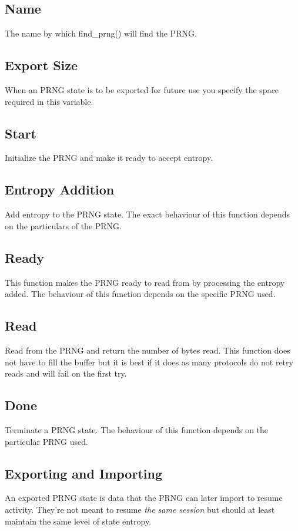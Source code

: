 \documentclass[synpaper]{book}
\begin{document}
\subsection{Name}
The name by which find\_prng() will find the PRNG.

\subsection{Export Size}
When an PRNG state is to be exported for future use you specify the space required in this variable.

\subsection{Start}
Initialize the PRNG and make it ready to accept entropy.

\subsection{Entropy Addition}
Add entropy to the PRNG state.  The exact behaviour of this function depends on the particulars of the PRNG.

\subsection{Ready}
This function makes the PRNG ready to read from by processing the entropy added.  The behaviour of this function depends
on the specific PRNG used.

\subsection{Read}
Read from the PRNG and return the number of bytes read.  This function does not have to fill the buffer but it is best 
if it does as many protocols do not retry reads and will fail on the first try.

\subsection{Done}
Terminate a PRNG state.  The behaviour of this function depends on the particular PRNG used.

\subsection{Exporting and Importing}
An exported PRNG state is data that the PRNG can later import to resume activity.  They're not meant to resume \textit{the same session}
but should at least maintain the same level of state entropy.
\end{document}
